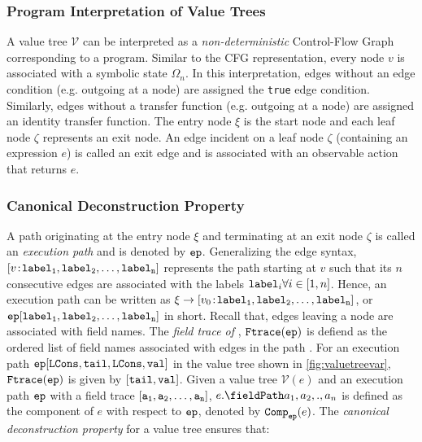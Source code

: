 \subsubsection{Program Interpretation of Value Trees}
\label{sec:valuetreeasprog}
A value tree $\mathcal{V}$ can be interpreted as a {\em non-deterministic} Control-Flow Graph corresponding to a program.
Similar to the CFG representation, every node $v$ is associated with a symbolic state $\Omega_n$.
In this interpretation, edges without an edge condition (e.g. outgoing at a \prodn{} node) are assigned the {\tt true}
edge condition. Similarly, edges without a transfer function (e.g. outgoing at a \sumn{} node) are assigned an
identity transfer function.
The entry node $\xi$ is the start node and each leaf node $\zeta$ represents an exit node.
An edge incident on a leaf node $\zeta$ (containing an expression $e$) is called an exit edge and is associated
with an observable action that returns $e$.



\subsubsection{Canonical Deconstruction Property}
\label{sec:valuetreecanonicaldecons}
A path originating at the entry node $\xi$ and terminating at an exit node $\zeta$ is called an
{\em execution path} and is denoted by ${\tt ep}{}$.
Generalizing the edge syntax, ${[v \! : \! {\tt label_1,label_2,\dots ,label_n}]}$ represents the path
starting at $v$ such that its $n$ consecutive edges are associated with the labels ${\tt label}_i \forall i \in [1,n]$.
Hence, an execution path \execpath{} can be written as $\xi \rightarrow {\ensuremath{[v_0 \! : \! {\tt label_1,label_2,\dots ,label_n}]}}$,
or ${\tt ep}{}[{\tt label_1,label_2,\dots,label_n}]$ in short.
Recall that, edges leaving a \prodn{} node are associated with field names.
The {\em field trace of \execpath{}}, ${{\tt Ftrace}({\tt ep}{})}$ is defiend as the ordered list of field names associated with edges in the path \execpath{}.
For an execution path ${\tt ep}{}[{\tt LCons},{{\tt tail}},{\tt LCons},{{\tt val}}]$ in the value tree shown in \cref{fig:valuetreevar},
${{\tt Ftrace}({\tt ep}{})}$ is given by $[{{\tt tail}},{{\tt val}}]$.
Given a value tree $\mathcal{V}(e)$ and an execution path ${\tt ep}{}$ with a field trace $[{\tt a_1,a_2,\dots,a_n}]$,
$\prodAccess{e}{a_1,a_2,.,a_n}$ is defined as the component of $e$ with respect to ${\tt ep}{}$, denoted by ${{\tt Comp}_{{\tt ep}{}}(e)}$.
The {\em canonical deconstruction property} for a value tree ensures that:


